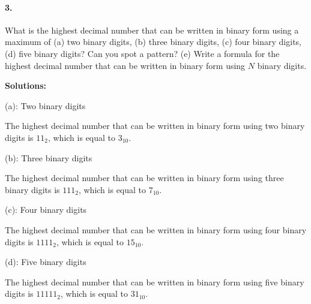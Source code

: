 \documentclass{article}
\begin{document}
\paragraph*{3.}
What is the highest decimal number that can be written in binary form using a maximum of (a) two binary digits, 
(b) three binary digits, (c) four binary digits, (d) five binary digits? Can you spot a pattern? (e) Write a formula for 
the highest decimal number that can be written in binary form using $N$ binary digits.

\vspace*{0.5cm}

\noindent \textbf{Solutions:}

\vspace*{0.25cm}

\noindent (a): Two binary digits

\vspace*{0.25cm}

\noindent The highest decimal number that can be written in binary form using two binary digits is $11_2$, which is equal to $3_{10}$.

\vspace*{0.5cm}

\noindent (b): Three binary digits

\vspace*{0.25cm}

\noindent The highest decimal number that can be written in binary form using three binary digits is $111_2$, which is equal to $7_{10}$.

\vspace*{0.5cm}

\noindent (c): Four binary digits

\vspace*{0.25cm}

\noindent The highest decimal number that can be written in binary form using four binary digits is $1111_2$, which is equal to $15_{10}$.

\vspace*{0.5cm}

\noindent (d): Five binary digits

\vspace*{0.25cm}

\noindent The highest decimal number that can be written in binary form using five binary digits is $11111_2$, which is equal to $31_{10}$.

\vspace*{0.5cm}
\end{document}
